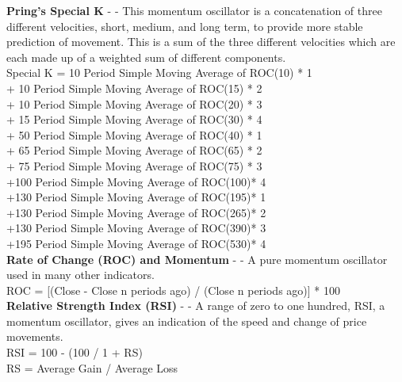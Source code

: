 \documentclass[conference]{IEEEtran}
\begin{document}

\noindent
\textbf{Pring's Special K} - \cite{Pring2002} - This momentum oscillator is a concatenation of three different velocities, short, medium, and long term, to provide more stable prediction of movement. This is a sum of the three different velocities which are each made up of a weighted sum of different components.\\

\noindent
Special K = 10 Period Simple Moving Average of ROC(10) * 1 \\
            + 10 Period Simple Moving Average of ROC(15) * 2 \\
            + 10 Period Simple Moving Average of ROC(20) * 3 \\
            + 15 Period Simple Moving Average of ROC(30) * 4 \\
            + 50 Period Simple Moving Average of ROC(40) * 1 \\
            + 65 Period Simple Moving Average of ROC(65) * 2 \\
            + 75 Period Simple Moving Average of ROC(75) * 3 \\
            +100 Period Simple Moving Average of ROC(100)* 4 \\
            +130 Period Simple Moving Average of ROC(195)* 1 \\
            +130 Period Simple Moving Average of ROC(265)* 2 \\
            +130 Period Simple Moving Average of ROC(390)* 3 \\
            +195 Period Simple Moving Average of ROC(530)* 4 \\

\noindent
\textbf{Rate of Change (ROC) and Momentum} - \cite{Murphy1999} - A pure momentum oscillator used in many other indicators.\\

\noindent
ROC = [(Close - Close n periods ago) / (Close n periods ago)] * 100 \\

\noindent
\textbf{Relative Strength Index (RSI)} - \cite{Wilder1978} - A range of zero to one hundred, RSI, a momentum oscillator, gives an indication of the speed and change of price movements.\\

\noindent
RSI = 100 - (100 / 1 + RS) \\
RS = Average Gain / Average Loss\\
\end{document}
